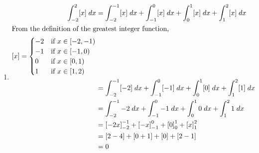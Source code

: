\begin{enumerate}
\begin{solution}
\begin{enumerate}
                \item
                    \begin{align*}
                        \int_{-2}^2 [x] \; dx &= \int_{-2}^{-1} [x] \; dx + \int_{-1}^{0} [x] \; dx + \int_{0}^{1} [x] \; dx + \int_{1}^{2} [x] \; dx\\
                        \intertext{From the definition of the greatest integer function,}
                        [x] = \begin{cases}
                            -2 & \text{if } x \in [-2, -1)\\
                            -1 & \text{if } x \in [-1, 0)\\
                            0 & \text{if } x \in [0, 1)\\
                            1 & \text{if } x \in [1, 2)
                        \end{cases}\\
                        &= \int_{-2}^{-1} [-2] \; dx + \int_{-1}^{0} [-1] \; dx + \int_{0}^{1} [0] \; dx + \int_{1}^{2} [1] \; dx\\
                        &= \int_{-2}^{-1} -2 \; dx + \int_{-1}^{0} -1 \; dx + \int_{0}^{1} 0 \; dx + \int_{1}^{2} 1 \; dx\\
                        &= \left[-2x\right]_{-2}^{-1} + \left[-x\right]_{-1}^{0} + \left[0\right]_{0}^{1} + \left[x\right]_{1}^{2}\\
                        &= \left[2 - 4\right] + \left[0 + 1\right] + \left[0\right] + \left[2 - 1\right]\\
                        &= 0
                    \end{align*}


\end{enumerate}
\end{solution}
\end{enumerate}
